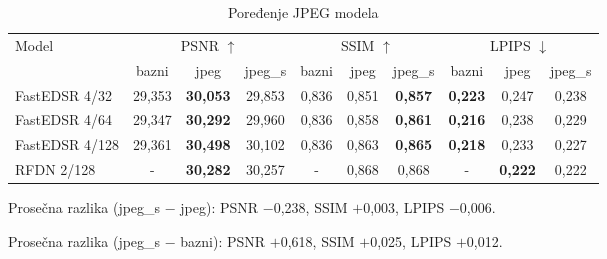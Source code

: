 \begin{table}[H]
    \begin{tabular}{lccccccccc}
        \toprule
        Model & \multicolumn{3}{c}{PSNR $\uparrow$} & \multicolumn{3}{c}{SSIM $\uparrow$} & \multicolumn{3}{c}{LPIPS $\downarrow$} \\
        \cmidrule(lr){2-4}\cmidrule(lr){5-7}\cmidrule(lr){8-10}
         & bazni & jpeg & jpeg\_s & bazni & jpeg & jpeg\_s & bazni & jpeg & jpeg\_s \\
        \midrule
        FastEDSR 4/32 & 29,353 & \textbf{30,053} & 29,853 & 0,836 & 0,851 & \textbf{0,857} & \textbf{0,223} & 0,247 & 0,238 \\
        FastEDSR 4/64 & 29,347 & \textbf{30,292} & 29,960 & 0,836 & 0,858 & \textbf{0,861} & \textbf{0,216} & 0,238 & 0,229 \\
        FastEDSR 4/128 & 29,361 & \textbf{30,498} & 30,102 & 0,836 & 0,863 & \textbf{0,865} & \textbf{0,218} & 0,233 & 0,227 \\
        RFDN 2/128 & - & \textbf{30,282} & 30,257 & - & 0,868 & 0,868 & - & \textbf{0,222} & 0,222 \\
        \bottomrule
    \end{tabular}
    \caption{Poređenje JPEG modela}
    \label{tab:jpeg_DIV2K_jpeg80_vs_s}
\end{table}

\noindent Prosečna razlika (jpeg\_s $-$ jpeg): PSNR $-$0,238, SSIM $+$0,003, LPIPS $-$0,006.

\noindent Prosečna razlika (jpeg\_s $-$ bazni): PSNR $+$0,618, SSIM $+$0,025, LPIPS $+$0,012.